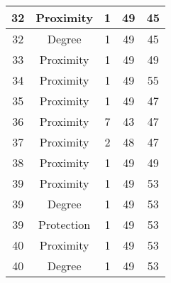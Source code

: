 \documentclass[results.tex]{subfiles}
\begin{document}
\begin{center}
\begin{tabular}{| c || c | c | c | c |}
            \hline
            32                      & Proximity                    & 1                      & 49                      & 45                   \\
            \hline
            32                      & Degree                       & 1                      & 49                      & 45                   \\
            \hline
            33                      & Proximity                    & 1                      & 49                      & 49                   \\
            \hline
            34                      & Proximity                    & 1                      & 49                      & 55                   \\
            \hline
            35                      & Proximity                    & 1                      & 49                      & 47                   \\
            \hline
            36                      & Proximity                    & 7                      & 43                      & 47                   \\
            \hline
            37                      & Proximity                    & 2                      & 48                      & 47                   \\
            \hline
            38                      & Proximity                    & 1                      & 49                      & 49                   \\
            \hline
            39                      & Proximity                    & 1                      & 49                      & 53                   \\
            \hline
            39                      & Degree                       & 1                      & 49                      & 53                   \\
            \hline
            39                      & Protection                   & 1                      & 49                      & 53                   \\
            \hline
            40                      & Proximity                    & 1                      & 49                      & 53                   \\
            \hline
            40                      & Degree                       & 1                      & 49                      & 53                   \\

\end{tabular}
\end{center}
\end{document}
